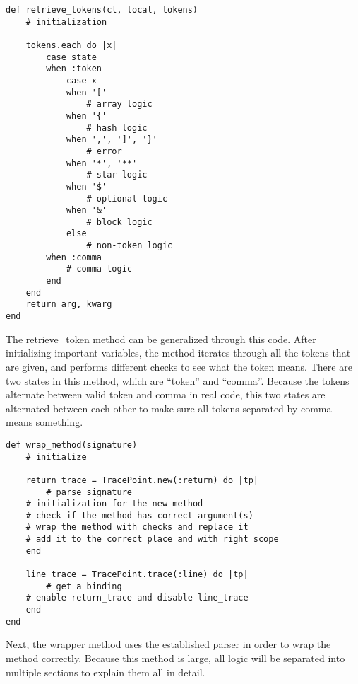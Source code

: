 \begin{lstlisting}[caption={Retriever method}]
def retrieve_tokens(cl, local, tokens)
    # initialization

    tokens.each do |x|
        case state
        when :token
            case x
            when '['
                # array logic
            when '{'
                # hash logic
            when ',', ']', '}'
                # error
            when '*', '**'
                # star logic
            when '$'
                # optional logic
            when '&'
                # block logic
            else
                # non-token logic
        when :comma
            # comma logic
        end
    end
    return arg, kwarg
end
\end{lstlisting}

The retrieve\_token method can be generalized through this code.  After initializing important variables, the method iterates through all the tokens that are given, and performs different checks to see what the token means.  There are two states in this method, which are ``token'' and ``comma''.  Because the tokens alternate between valid token and comma in real code, this two states are alternated between each other to make sure all tokens separated by comma means something.

\begin{lstlisting}[caption={Wrapper method: overview}]
def wrap_method(signature)
    # initialize

    return_trace = TracePoint.new(:return) do |tp|
        # parse signature
	# initialization for the new method
	# check if the method has correct argument(s)
	# wrap the method with checks and replace it
	# add it to the correct place and with right scope
    end

    line_trace = TracePoint.trace(:line) do |tp|
    	# get a binding
	# enable return_trace and disable line_trace
    end
end
\end{lstlisting}

Next, the wrapper method uses the established parser in order to wrap the method correctly.  Because this method is large, all logic will be separated into multiple sections to explain them all in detail.

